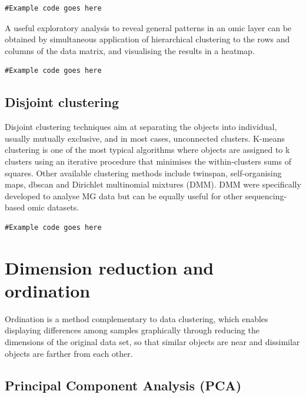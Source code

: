 \documentclass[
]{book}
\begin{document}
\begin{verbatim}
#Example code goes here
\end{verbatim}

A useful exploratory analysis to reveal general patterns in an omic layer can be obtained by simultaneous application of hierarchical clustering to the rows and columns of the data matrix, and visualising the results in a heatmap.

\begin{verbatim}
#Example code goes here
\end{verbatim}

\hypertarget{disjoint-clustering}{%
\subsection{Disjoint clustering}\label{disjoint-clustering}}

Disjoint clustering techniques aim at separating the objects into individual, usually mutually exclusive, and in most cases, unconnected clusters. K-means clustering is one of the most typical algorithms where objects are assigned to k clusters using an iterative procedure that minimises the within-clusters sums of squares. Other available clustering methods include twinspan, self-organising maps, dbscan and Dirichlet multinomial mixtures (DMM). DMM were specifically developed to analyse MG data but can be equally useful for other sequencing-based omic datasets.

\begin{verbatim}
#Example code goes here
\end{verbatim}

\hypertarget{dimension-reduction-ordination}{%
\section{Dimension reduction and ordination}\label{dimension-reduction-ordination}}

Ordination is a method complementary to data clustering, which enables displaying differences among samples graphically through reducing the dimensions of the original data set, so that similar objects are near and dissimilar objects are farther from each other.

\hypertarget{pca}{%
\subsection{Principal Component Analysis (PCA)}\label{pca}}
\end{document}

